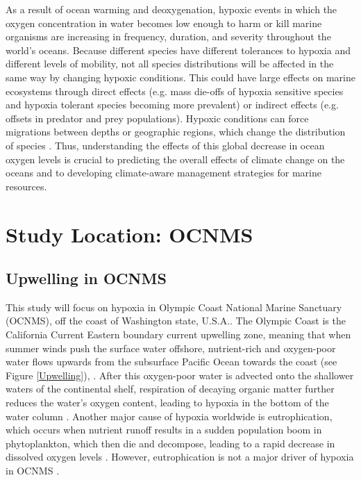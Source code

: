 \documentclass[12pt,twoside]{reedthesis}
\begin{document}
As a result of ocean warming and deoxygenation, hypoxic events in which the oxygen concentration in water becomes low enough to harm or kill marine organisms are increasing in frequency, duration, and severity throughout the world's oceans. Because different species have different tolerances to hypoxia and different levels of mobility, not all species distributions will be affected in the same way by changing hypoxic conditions. This could have large effects on marine ecosystems through direct effects (e.g. mass die-offs of hypoxia sensitive species and hypoxia tolerant species becoming more prevalent) or indirect effects (e.g. offsets in predator and prey populations). Hypoxic conditions can force migrations between depths or geographic regions, which change the distribution of species \autocite{Deutsch2024, Pihl1991}. Thus, understanding the effects of this global decrease in ocean oxygen levels is crucial to predicting the overall effects of climate change on the oceans and to developing climate-aware management strategies for marine resources. 

\section{Study Location: OCNMS}

\subsection{Upwelling in OCNMS}

This study will focus on hypoxia in Olympic Coast National Marine Sanctuary (OCNMS), off the coast of Washington state, U.S.A.. The Olympic Coast is the California Current Eastern boundary current upwelling zone, meaning that when summer winds push the surface water offshore, nutrient-rich and oxygen-poor water flows upwards from the subsurface Pacific Ocean towards the coast (see Figure \ref{Upwelling}), \autocite{OfficeofNationalMarineSanctuaries2022, Hickey2003}. After this oxygen-poor water is advected onto the shallower waters of the continental shelf, respiration of decaying organic matter further reduces the water's oxygen content, leading to hypoxia in the bottom of the water column \autocite{Pierce2012, Landry1989}. Another major cause of hypoxia worldwide is eutrophication, which occurs when nutrient runoff results in a sudden population boom in phytoplankton, which then die and decompose, leading to a rapid decrease in dissolved oxygen levels \autocite{Deutsch2024}. However, eutrophication is not a major driver of hypoxia in OCNMS \autocite{OfficeofNationalMarineSanctuaries2022}.
\end{document}
